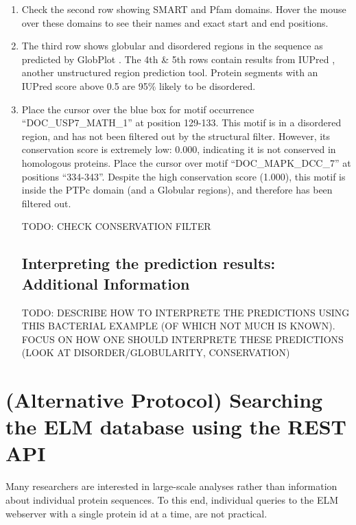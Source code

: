 \documentclass[12pt]{article}
\begin{document}
\begin{enumerate}
\item Check the second row showing SMART and Pfam domains. Hover the mouse over
	these domains to see their names and exact start and end positions.

\item The third row shows globular and disordered regions in the sequence as
	predicted by GlobPlot \citep{12824398}. The 4th \& 5th rows contain
	results from IUPred \citep{15955779}, another unstructured region
	prediction tool. Protein segments with an IUPred score above 0.5 are
	95\% likely to be disordered.  

\item Place the cursor over the blue box for motif occurrence
	``DOC\_USP7\_MATH\_1'' at position 129-133. This motif is in a
	disordered region, and has not been filtered out by the structural
	filter. However, its conservation score is extremely low: 0.000,
	indicating it is not conserved in homologous proteins. Place the cursor
	over motif ``DOC\_MAPK\_DCC\_7'' at positions ``334-343''. Despite the
	high conservation score (1.000), this motif is inside the PTPc domain
	(and a Globular regions), and therefore has been filtered out.

TODO: CHECK CONSERVATION FILTER

%
%
\subsection*{Interpreting the prediction results: Additional Information}
\label{subsec:predicting_cv_0974_additional_information}

TODO: DESCRIBE HOW TO INTERPRETE THE PREDICTIONS USING THIS BACTERIAL
EXAMPLE (OF WHICH NOT MUCH IS KNOWN). FOCUS ON HOW ONE SHOULD INTERPRETE
THESE PREDICTIONS (LOOK AT DISORDER/GLOBULARITY, CONSERVATION)

\end{enumerate}

\clearpage

\section{(Alternative Protocol) Searching the ELM database using the REST API}
\label{sec:search_REST}

Many researchers are interested in large-scale analyses rather than
information about individual protein sequences. To this end, individual
queries to the ELM webserver with a single protein id at a time, are not
practical.
\end{document}
